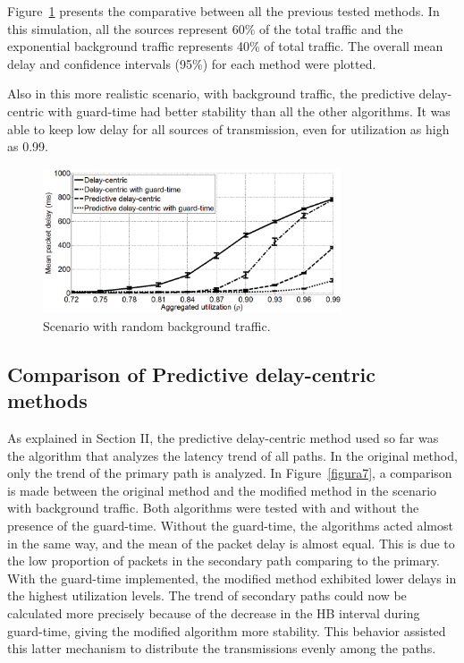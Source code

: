 \documentclass[letterpaper,10pt,oneside,conference,final]{sbrt2015}
\begin{document}
Figure~\ref{figura6} presents the comparative between all the previous tested methods. In this simulation, all the sources represent 60\% of the total traffic and the exponential background traffic represents 40\% of total traffic. The overall mean delay and confidence intervals (95\%) for each method were plotted.

Also in this more realistic scenario, with background traffic, the predictive delay-centric with guard-time had better stability than all the other algorithms. It was able to keep low delay for all sources of transmission, even for utilization as high as 0.99.


\begin{figure}[h!]
\centering
\includegraphics[width=8.8cm,height=4.3cm]{figura6}
\caption{Scenario with random background traffic.}
\label{figura6}
\end{figure}

\subsection{Comparison of Predictive delay-centric methods}
As explained in Section II, the predictive delay-centric method used so far was the algorithm that analyzes the latency trend of all paths. In the original method, only the trend of the primary path is analyzed. In Figure~\ref{figura7}, a comparison is made between the original method and the modified method in the scenario with background traffic. Both algorithms were tested with and without the presence of the guard-time.
Without the guard-time, the algorithms acted almost in the same way, and the mean of the packet delay is almost equal. This is due to the low proportion of packets in the secondary path comparing to the primary. With the guard-time implemented, the modified method exhibited lower delays in the highest utilization levels. The trend of secondary paths could now be calculated more precisely because of the decrease in the HB interval during guard-time, giving the modified algorithm more stability. This behavior assisted this latter mechanism to distribute the transmissions evenly among the paths.
\end{document}
